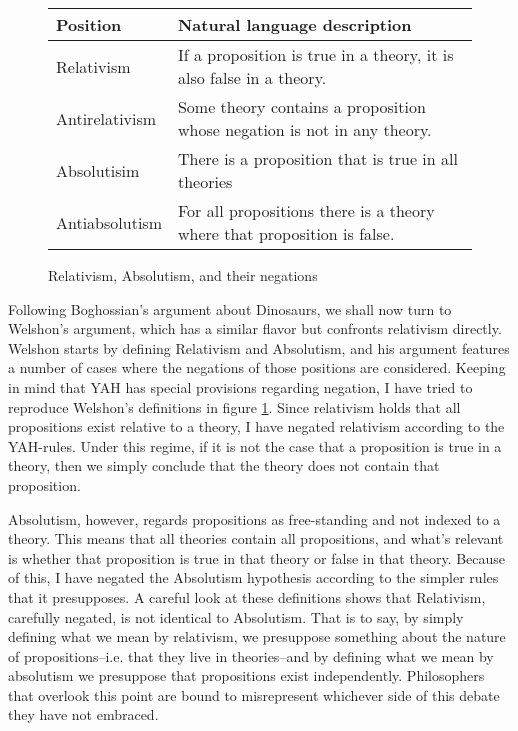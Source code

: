 \documentclass[12pt]{article}
\begin{document}
\begin{flushleft}
\begin{figure}[h]
    \begin{tabular}{p{}|p{}}
    Position & Natural language description \\ \hline
    Relativism & If a proposition is true in a theory, it is also false in a theory. \\
    Antirelativism & Some theory contains a proposition whose negation is not in any theory. \\
    Absolutisim & There is a proposition that is true in all theories \\
    Antiabsolutism & For all propositions there is a theory where that proposition is false.
    \end{tabular}
    \caption{Relativism, Absolutism, and their negations}
    \label{definitions}
\end{figure}

Following Boghossian's argument about Dinosaurs, we shall now turn to Welshon's argument, which has a similar flavor but confronts relativism directly.
Welshon starts by defining Relativism and Absolutism, and his argument features a number of cases where the negations of those positions are considered.
Keeping in mind that YAH has special provisions regarding negation, I have tried to reproduce Welshon's definitions in figure \ref{definitions}.
Since relativism holds that all propositions exist relative to a theory, I have negated relativism according to the YAH-rules.
Under this regime, if it is not the case that a proposition is true in a theory, then we simply conclude that the theory does not contain that proposition.

Absolutism, however, regards propositions as free-standing and not indexed to a theory.
This means that all theories contain all propositions, and what's relevant is whether that proposition is true in that theory or false in that theory.
Because of this, I have negated the Absolutism hypothesis according to the simpler rules that it presupposes.
A careful look at these definitions shows that Relativism, carefully negated, is not identical to Absolutism.
That is to say, by simply defining what we mean by relativism, we presuppose something about the nature of propositions--i.e. that they live in theories--and by defining what we mean by absolutism we presuppose that propositions exist independently.
Philosophers that overlook this point are bound to misrepresent whichever side of this debate they have not embraced.



\end{flushleft}
\end{document}
